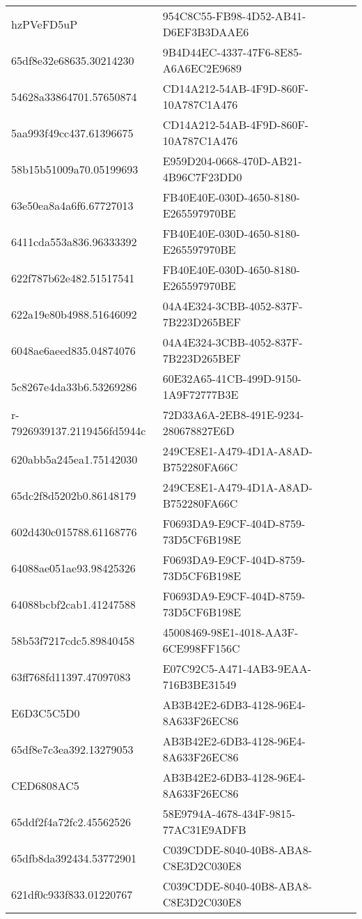 \begin{tabular}{ll}
hzPVeFD5uP & 954C8C55-FB98-4D52-AB41-D6EF3B3DAAE6 \\
65df8e32e68635.30214230 & 9B4D44EC-4337-47F6-8E85-A6A6EC2E9689 \\
54628a33864701.57650874 & CD14A212-54AB-4F9D-860F-10A787C1A476 \\
5aa993f49cc437.61396675 & CD14A212-54AB-4F9D-860F-10A787C1A476 \\
58b15b51009a70.05199693 & E959D204-0668-470D-AB21-4B96C7F23DD0 \\
63e50ea8a4a6f6.67727013 & FB40E40E-030D-4650-8180-E265597970BE \\
6411cda553a836.96333392 & FB40E40E-030D-4650-8180-E265597970BE \\
622f787b62e482.51517541 & FB40E40E-030D-4650-8180-E265597970BE \\
622a19e80b4988.51646092 & 04A4E324-3CBB-4052-837F-7B223D265BEF \\
6048ae6aeed835.04874076 & 04A4E324-3CBB-4052-837F-7B223D265BEF \\
5c8267e4da33b6.53269286 & 60E32A65-41CB-499D-9150-1A9F72777B3E \\
r-7926939137.2119456fd5944c & 72D33A6A-2EB8-491E-9234-280678827E6D \\
620abb5a245ea1.75142030 & 249CE8E1-A479-4D1A-A8AD-B752280FA66C \\
65dc2f8d5202b0.86148179 & 249CE8E1-A479-4D1A-A8AD-B752280FA66C \\
602d430c015788.61168776 & F0693DA9-E9CF-404D-8759-73D5CF6B198E \\
64088ae051ae93.98425326 & F0693DA9-E9CF-404D-8759-73D5CF6B198E \\
64088bcbf2cab1.41247588 & F0693DA9-E9CF-404D-8759-73D5CF6B198E \\
58b53f7217cdc5.89840458 & 45008469-98E1-4018-AA3F-6CE998FF156C \\
63ff768fd11397.47097083 & E07C92C5-A471-4AB3-9EAA-716B3BE31549 \\
E6D3C5C5D0 & AB3B42E2-6DB3-4128-96E4-8A633F26EC86 \\
65df8e7c3ea392.13279053 & AB3B42E2-6DB3-4128-96E4-8A633F26EC86 \\
CED6808AC5 & AB3B42E2-6DB3-4128-96E4-8A633F26EC86 \\
65ddf2f4a72fc2.45562526 & 58E9794A-4678-434F-9815-77AC31E9ADFB \\
65dfb8da392434.53772901 & C039CDDE-8040-40B8-ABA8-C8E3D2C030E8 \\
621df0c933f833.01220767 & C039CDDE-8040-40B8-ABA8-C8E3D2C030E8 \\

\end{tabular}
